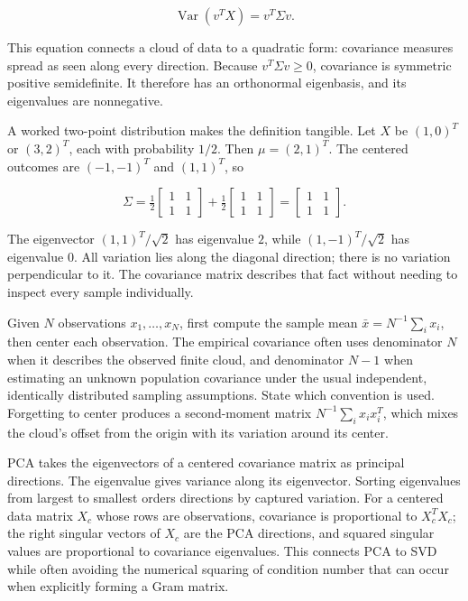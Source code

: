 \[
\operatorname{Var}(v^TX)=v^T\Sigma v.
\]

This equation connects a cloud of data to a quadratic form: covariance measures spread as seen along every direction. Because \(v^T\Sigma v\ge 0\), covariance is symmetric positive semidefinite. It therefore has an orthonormal eigenbasis, and its eigenvalues are nonnegative.

A worked two-point distribution makes the definition tangible. Let \(X\) be \((1,0)^T\) or \((3,2)^T\), each with probability \(1/2\). Then \(\mu=(2,1)^T\). The centered outcomes are \((-1,-1)^T\) and \((1,1)^T\), so

\[
\Sigma=\tfrac12\begin{bmatrix}1&1\\1&1\end{bmatrix}
+\tfrac12\begin{bmatrix}1&1\\1&1\end{bmatrix}
=\begin{bmatrix}1&1\\1&1\end{bmatrix}.
\]

The eigenvector \((1,1)^T/\sqrt2\) has eigenvalue \(2\), while \((1,-1)^T/\sqrt2\) has eigenvalue \(0\). All variation lies along the diagonal direction; there is no variation perpendicular to it. The covariance matrix describes that fact without needing to inspect every sample individually.

Given \(N\) observations \(x_1,\ldots,x_N\), first compute the sample mean \(\bar x=N^{-1}\sum_i x_i\), then center each observation. The empirical covariance often uses denominator \(N\) when it describes the observed finite cloud, and denominator \(N-1\) when estimating an unknown population covariance under the usual independent, identically distributed sampling assumptions. State which convention is used. Forgetting to center produces a second-moment matrix \(N^{-1}\sum_i x_ix_i^T\), which mixes the cloud's offset from the origin with its variation around its center.

PCA takes the eigenvectors of a centered covariance matrix as principal directions. The eigenvalue gives variance along its eigenvector. Sorting eigenvalues from largest to smallest orders directions by captured variation. For a centered data matrix \(X_c\) whose rows are observations, covariance is proportional to \(X_c^TX_c\); the right singular vectors of \(X_c\) are the PCA directions, and squared singular values are proportional to covariance eigenvalues. This connects PCA to SVD while often avoiding the numerical squaring of condition number that can occur when explicitly forming a Gram matrix.

